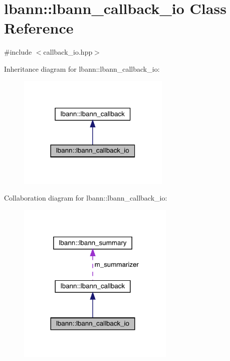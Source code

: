 \hypertarget{classlbann_1_1lbann__callback__io}{}\section{lbann\+:\+:lbann\+\_\+callback\+\_\+io Class Reference}
\label{classlbann_1_1lbann__callback__io}


{\ttfamily \#include $<$callback\+\_\+io.\+hpp$>$}



Inheritance diagram for lbann\+:\+:lbann\+\_\+callback\+\_\+io\+:\nopagebreak
\begin{figure}[H]
\begin{center}
\leavevmode
\includegraphics[width=206pt]{classlbann_1_1lbann__callback__io__inherit__graph}
\end{center}
\end{figure}


Collaboration diagram for lbann\+:\+:lbann\+\_\+callback\+\_\+io\+:\nopagebreak
\begin{figure}[H]
\begin{center}
\leavevmode
\includegraphics[width=212pt]{classlbann_1_1lbann__callback__io__coll__graph}
\end{center}
\end{figure}
